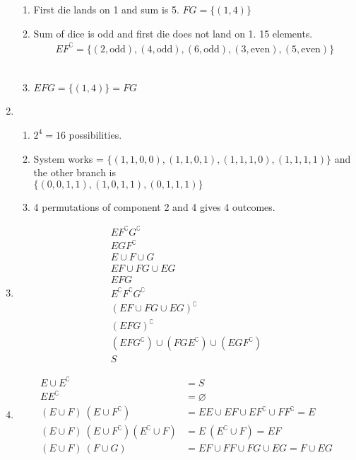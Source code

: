 \begin{enumerate}
\begin{enumerate}
		\item First die lands on 1 and sum is 5. $ FG = \{ (1,4) \} $ \\
		
		\item Sum of dice is odd and first die does not land on 1. 15 elements.
		\begin{align}
			E F^\complement = \{ (2, \text{odd}), (4, \text{odd}) , (6, \text{odd}), (3, \text{even}), (5, \text{even})\} 
		\end{align} \\
		
		\item $ EFG = \{ (1, 4) \} = FG $
	\end{enumerate} 
	
	\item \begin{enumerate}
		\item $ 2^4 = 16 $ possibilities. \\
		
		\item System works = $ \{ (1,1,0,0), (1,1,0,1), (1,1,1,0), (1,1,1,1)\} $ and the other branch is \\
		$ \{ (0,0,1,1), (1,0,1,1), (0,1,1,1) \} $ \\
		
		\item 4 permutations of component 2 and 4 gives 4 outcomes.
	\end{enumerate}
	
	\item 
		\begin{align}
			E F^\complement G^\complement \\
			E G F^\complement \\
			E \cup F \cup G \\
			EF \cup FG \cup EG \\
			EFG \\
			E ^\complement F^\complement G^\complement \\
			(EF \cup FG \cup EG )^\complement \\
			( EFG )^\complement \\
			( EF G^\complement) \cup (FG E^\complement) \cup (EG F^\complement) \\
			S
		\end{align}
	
	
	\item 
		\begin{align}
			E \cup E^\complement &= S \\
			E E^\complement &= \varnothing \\
			(E \cup F)\ (E \cup F^\complement) &= EE \cup EF \cup EF^\complement \cup FF^\complement = E \\
			(E \cup F)\ (E \cup F^\complement) (E^\complement \cup F) &= E\ (E^\complement \cup F) = EF \\
			(E \cup F)\ (F \cup G) &= EF \cup FF \cup FG \cup EG = F \cup EG
		\end{align}
	

\end{enumerate}
